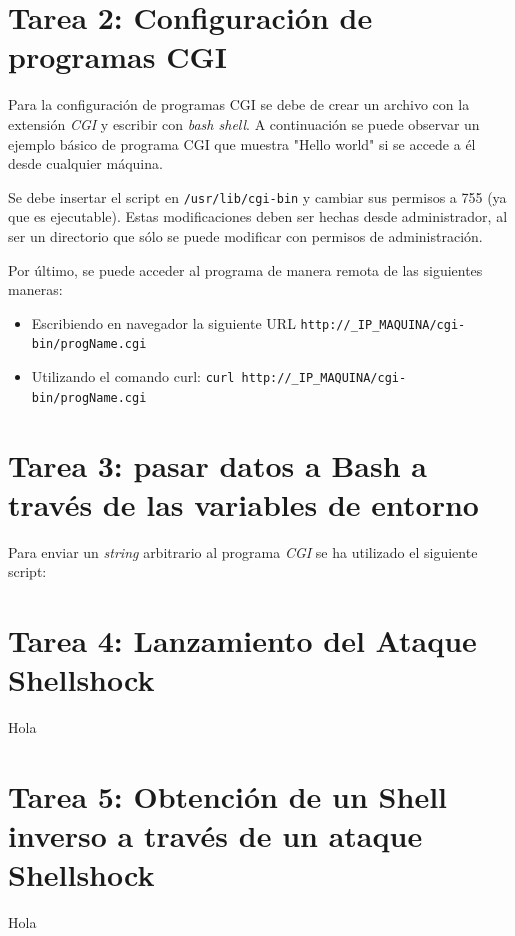 \documentclass[10pt,a4paper]{article}
\begin{document}
\section{Tarea 2: Configuración de programas CGI}

Para la configuración de programas CGI se debe de crear un archivo con la extensión \emph{CGI} y escribir con \emph{bash shell}.
A continuación se puede observar un ejemplo básico de programa CGI que muestra "Hello world" si se accede a él desde cualquier máquina.
 

Se debe insertar el script en \texttt{/usr/lib/cgi-bin} y cambiar sus permisos a 755 (ya que es ejecutable). Estas modificaciones deben ser hechas desde administrador, al ser un directorio que sólo se puede modificar con permisos de administración. 

Por último, se puede acceder al programa de manera remota de las siguientes maneras: 
\begin{itemize}
	\item Escribiendo en navegador la siguiente URL \texttt{http://_IP_MAQUINA/cgi-bin/progName.cgi}
	\item Utilizando el comando curl: \texttt{curl http://_IP_MAQUINA/cgi-bin/progName.cgi}
\end{itemize}

\section{Tarea 3: pasar datos a Bash a través de las variables de entorno}

Para enviar un \emph{string} arbitrario al programa \emph{CGI} se ha utilizado el siguiente script:\\




\section{Tarea 4: Lanzamiento del Ataque Shellshock}

Hola

\section{Tarea 5: Obtención de un Shell inverso a través de un ataque Shellshock}

Hola
\end{document}
